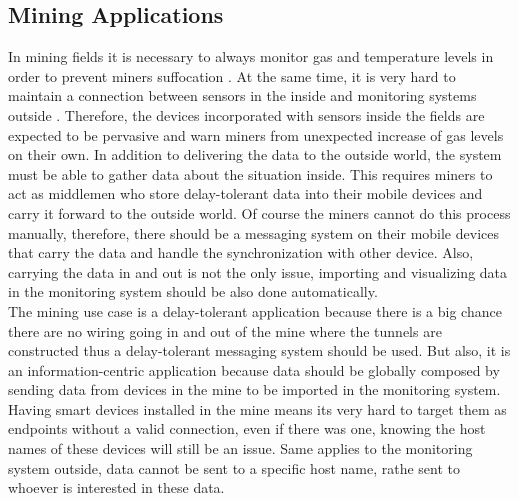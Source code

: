 


\subsection{Mining Applications}

In mining fields it is necessary to always monitor gas and temperature levels in order to prevent miners suffocation \cite{doi:10.1155/2013/159273}. At the same time, it is very hard to maintain a connection between sensors in the inside and  monitoring systems outside \cite{ginzboorg2010dtn}. Therefore, the devices incorporated with sensors inside the fields are expected to be pervasive and warn miners from unexpected increase of gas levels on their own. In addition to delivering the data to the outside world, the system must be able to gather data about the situation inside. This requires miners to act as middlemen who store delay-tolerant data into their mobile devices and carry it forward to the outside world. Of course the miners cannot do this process manually, therefore, there should be a messaging system on their mobile devices that carry the data and handle the synchronization with other device. Also, carrying the data in and out is not the only issue, importing and visualizing  data in the monitoring system should be also done automatically.\\

\noindent The mining use case is a delay-tolerant application because there is a big chance there are no wiring going in and out of the mine where the tunnels are constructed thus a delay-tolerant messaging system should be used. But also, it is an information-centric  application because data should be globally composed by sending  data from  devices in the mine to be imported in  the monitoring system. Having smart devices installed in the mine means its very hard to target them as endpoints without a valid connection, even if there was one, knowing the host names of these devices will still be an issue. Same applies to the monitoring system outside,  data cannot be sent to a specific host name, rathe sent to whoever is interested in  these data.

